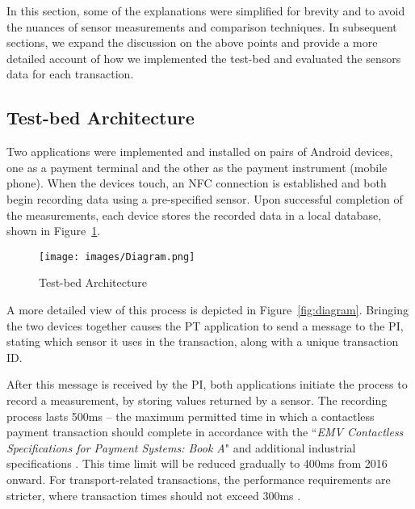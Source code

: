 \documentclass{article}
\begin{document}
In this section, some of the explanations were simplified for brevity and to avoid the nuances of sensor measurements and comparison techniques. In subsequent sections, we expand the discussion on the above points and provide a more detailed account of how we implemented the test-bed and evaluated the sensors data for each transaction. 

\subsection{Test-bed Architecture}
\label{sec:Test-Bed_Architecture}
Two applications were implemented and installed on pairs of Android devices, one as a payment terminal and the other as the payment instrument (mobile phone).
When the devices touch, an NFC connection is established and both begin recording data using a pre-specified sensor.  Upon successful completion of the measurements, each device stores the recorded data in a local database, shown in Figure~\ref{fig:Architecture}.

\begin{figure}[ht]
	\centering
	\texttt{[image: images/Diagram.png]}
	\caption{Test-bed Architecture}
	\label{fig:Architecture}
\end{figure}

A more detailed view of this process is depicted in Figure~\ref{fig:diagram}.  Bringing the two devices together causes the PT application to send a message to the PI, stating which sensor it uses in the transaction, along with a unique transaction ID\@.

After this message is received by the PI, both applications initiate the process to record a measurement, by storing values returned by a sensor.  The recording process lasts 500ms -- the maximum permitted time in which a contactless payment transaction should complete in accordance with the ``\textit{EMV Contactless Specifications for Payment Systems: Book A}" \cite{EVM2015-ContactlessArchitectureReq} and additional industrial specifications \cite{VISAMobileTicketing2013,MasterCard2014,VISA-TADG}. This time limit will be reduced gradually to 400ms from 2016 onward.  For transport-related transactions, the performance requirements are stricter, where transaction times should not exceed 300ms \cite{transport300,emms2014harvesting}.
\end{document}
